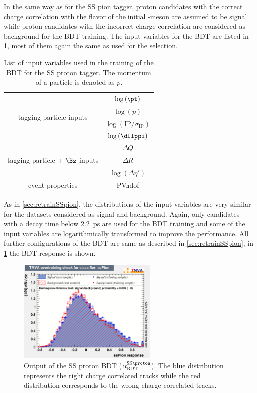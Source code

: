 In the same way as for the SS pion tagger, proton candidates with the correct charge correlation with the flavor of the initial \B-meson are assumed to be signal while proton candidates with the incorrect charge correlation are considered as background for the BDT training.
The input variables for the BDT are listed in \cref{tab:BDTInputSSProton}, most of them again the same as used for the selection.
\begin{table}[tbp]
	\centering
	\caption{List of input variables used in the training of the BDT for the SS proton tagger.
	The momentum of a particle is denoted as $p$.}
	\begin{tabular}{cc}
		\toprule
		\multirow{4}{*}{tagging particle inputs} 	&	$\log\left(\pt\right)$ \\
													&	$\log\left(p\right)$\\
													&	$\log\left(\text{IP}/\sigma_\text{IP}\right)$\\
													&	$\log\left(\dllppi\right)$\\
		\midrule
		\multirow{3}{*}{tagging particle + $\Bz$ inputs} 	& $\Delta Q$\\
															& $\Delta R$\\
															& $\log\left(\Delta\eta'\right)$\\
		\midrule
		\multirow{1}{*}{event properties} 	& PVndof\\
		\bottomrule
	\end{tabular}
	\label{tab:BDTInputSSProton}
\end{table}
As in \cref{sec:retrainSSpion}, the distributions of the input variables are very similar for the datasets considered as signal and background.
Again, only \B candidates with a decay time below \SI{2.2}{\pico\second} are used for the BDT training and some of the input variables are logarithmically transformed to improve the performance.
All further configurations of the BDT are same as described in \cref{sec:retrainSSpion}, in \cref{fig:SSProtonBDTOutput} the BDT response is shown.
\begin{figure}[htbp]
	\begin{center}
		\includegraphics[width=0.6\textwidth]{08FlavourTagging/figs/SSProton_overtrain.pdf}
	\end{center}
	\caption{Output of the SS proton BDT ($\alpha^{\text{SS}\proton}_\text{BDT}$).
	The blue distribution represents the right charge correlated tracks while the red distribution corresponds to the wrong charge correlated tracks.}
	\label{fig:SSProtonBDTOutput}
\end{figure}
